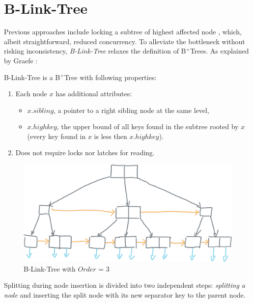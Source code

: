 \section{B-Link-Tree}\label{section:b-link-tree}

Previous approaches include locking a subtree of highest affected node \cite{samadi1976b}, which, albeit straightforward, reduced concurrency. To alleviate the bottleneck without risking inconsistency, \textit{B-Link-Tree} relaxes the definition of B$^+$Trees. As explained by Graefe \cite{goetz-tech}:

\begin{definition}
  B-Link-Tree is a B$^+$Tree with following properties:
  \begin{enumerate}
    \item Each node $x$ has additional attributes:
          \begin{itemize}
            \item $x.sibling$, a pointer to a right sibling node at the same level,
            \item $x.highkey$, the upper bound of all keys found in the subtree rooted by $x$ (every key found in $x$ is less then $x.highkey$).
          \end{itemize}
    \item Does not require locks nor latches for reading.
  \end{enumerate}
\end{definition}

\begin{figure}[H]
  \centering
  \includegraphics[width=\textwidth]{components/figure/b-link-tree.png}
  \caption{B-Link-Tree with $Order$ = 3}
  \label{figure:b-link-tree}
\end{figure}

Splitting during node insertion is divided into two independent steps:  \textit{splitting a node} and inserting the split node with its new separator key to the parent node.

